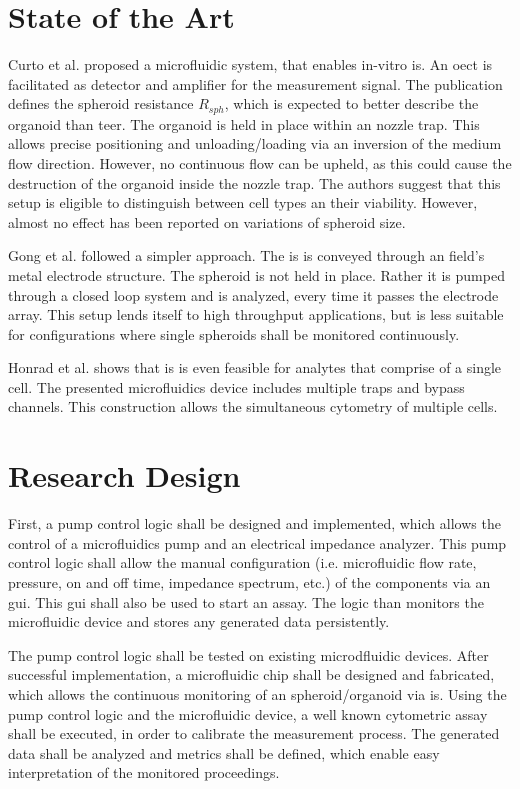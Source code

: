 \section{State of the Art}
\label{sec:state_of_the_art}
Curto et al. \cite{Curto2018} proposed a microfluidic system, that enables in-vitro \gls{is}. An \gls{oect} is facilitated as detector and amplifier for the measurement signal. The publication defines the spheroid resistance $R_{sph}$, which is expected to better describe the organoid than \gls{teer}. The organoid is held in place within an nozzle trap. This allows precise positioning and unloading/loading via an inversion of the medium flow direction. However, no continuous flow can be upheld, as this could cause the destruction of the organoid inside the nozzle trap. The authors suggest that this setup is eligible to distinguish between cell types an their viability. However, almost no effect has been reported on variations of spheroid size. 

Gong et al. \cite{Gong2021} followed a simpler approach. The \gls{is} is conveyed through an field's metal electrode structure. The spheroid is not held in place. Rather it is pumped through a closed loop system and is analyzed, every time it passes the electrode array. This setup lends itself to high throughput applications, but is less suitable for configurations where single spheroids shall be monitored continuously.

Honrad et al. \cite{Honrado2021} shows that \gls{is} is even feasible for analytes that comprise of a single cell. The presented microfluidics device includes multiple traps and bypass channels. This construction allows the simultaneous cytometry of multiple cells. 

\section{Research Design}
\label{sec:research_design}
First, a pump control logic shall be designed and implemented, which allows the control of a microfluidics pump and an electrical impedance analyzer. This pump control logic shall allow the manual configuration (i.e. microfluidic flow rate, pressure, on and off time, impedance spectrum, etc.) of the components via an \gls{gui}. This \gls{gui} shall also be used to start an assay. The logic than monitors the microfluidic device and stores any generated data persistently.

The pump control logic shall be tested on existing microdfluidic devices. After successful implementation, a microfluidic chip shall be designed and fabricated, which allows the continuous monitoring of an spheroid/organoid via \gls{is}. Using the pump control logic and the microfluidic device, a well known cytometric assay shall be executed, in order to calibrate the measurement process. The generated data shall be analyzed and metrics shall be defined, which enable easy interpretation of the monitored proceedings. 

